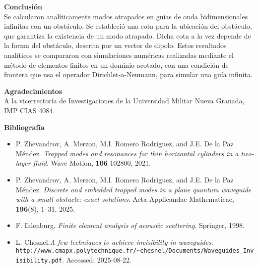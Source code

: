 \documentclass[11pt]{article}
\begin{document}
\vspace{1em}
\noindent\textbf{Conclusión}\\
Se calcularon anal\'iticamente modos atrapados en gu\'ias de onda bidimensionales infinitas con un obst\'aculo. Se estableci\'o una cota para la ubicaci\'on del obst\'aculo, que garantiza la existencia de un modo atrapado. Dicha cota a la vez depende de la forma del obst\'aculo, descrita por un vector de dipolo. Estos resultados anal\'iticos se compararon con simulaciones num\'ericas realizadas mediante el m\'etodo de elementos finitos en un dominio acotado, con una condici\'on de frontera que usa el operador Dirichlet-a-Neumann, para simular una gu\'ia infinita.

\vspace{1em}
\noindent\textbf{Agradecimientos}\\
A la vicerrectoría de Investigaciones de la Universidad Militar Nueva Granada, IMP CIAS 4084.

\vspace{1em}
\noindent\textbf{Bibliografía}
\begin{itemize}[leftmargin=1.5em]
  \item P. Zhevandrov, A. Merzon, M.I. Romero Rodr\'iguez, and J.E. De la Paz M\'endez. \textit{Trapped modes and resonances for thin horizontal cylinders in a two-layer fluid}. Wave Motion, \textbf{106} 102800, 2021.
  
  \item P. Zhevandrov, A. Merzon, M.I. Romero Rodr\'iguez, and J.E. De la Paz M\'endez. \textit{Discrete and embedded trapped modes in a plane quantum waveguide with a small obstacle: exact solutions}. Acta Applicandae
    Mathematicae, \textbf{196}(8), 1--31, 2025.

  \item F. Ihlenburg, \textit{Finite element analysis of acoustic scattering}. Springer,
1998.

\item L. Chesnel.\textit{A few techniques to achieve invisibility in waveguides}.\\
  {\tt http://www.cmapx.polytechnique.fr/\textasciitilde chesnel/Documents/Waveguides\_Invisibility.pdf}. Accessed: 2025-08-22.
  
\end{itemize}	
\end{document}
